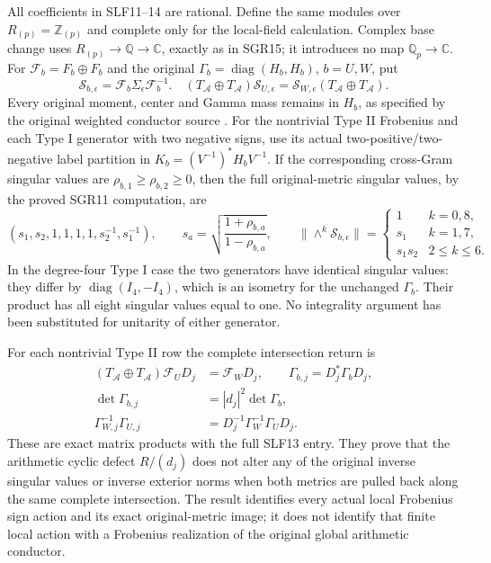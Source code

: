 \documentclass[11pt]{article}
\begin{document}
All coefficients in SLF11--14 are rational. Define the same modules
over $R_{(p)}=\mathbb Z_{(p)}$ and complete only for the local-field
calculation. Complex base change uses $R_{(p)}\to\mathbb Q\to\mathbb C$,
exactly as in SGR15; it introduces no map $\mathbb Q_p\to\mathbb C$.
For $\mathcal F_b=F_b\oplus F_b$ and the original
$\Gamma_b=\operatorname{diag}(H_b,H_b)$, $b=U,W$, put
\[
 \mathscr S_{b,\epsilon}=\mathcal F_b\Sigma_\epsilon\mathcal F_b^{-1}.
 \quad
 (T_{\mathcal A}\oplus T_{\mathcal A})\mathscr S_{U,\epsilon}
 =\mathscr S_{W,\epsilon}(T_{\mathcal A}\oplus T_{\mathcal A}).
                                                               \tag{SLF15}
\]
Every original moment, center and Gamma mass remains in $H_b$,
as specified by the original weighted conductor source \cite{WCF}.
For the nontrivial Type II Frobenius and each Type I generator with
two negative signs, use its actual two-positive/two-negative label
partition in $K_b=(V^{-1})^*H_bV^{-1}$.
If the corresponding cross-Gram singular values are
$\rho_{b,1}\ge\rho_{b,2}\ge0$, then the full original-metric
singular values, by the proved SGR11 computation, are
\[
 (s_1,s_2,1,1,1,1,s_2^{-1},s_1^{-1}),\qquad
 s_a=\sqrt{\frac{1+\rho_{b,a}}{1-\rho_{b,a}}},\qquad
 \|\wedge^k\mathscr S_{b,\epsilon}\|=
 \begin{cases}
 1&k=0,8,\\s_1&k=1,7,\\s_1s_2&2\le k\le6.
 \end{cases}                                                   \tag{SLF16}
\]
In the degree-four Type I case the two generators have identical
singular values: they differ by $\operatorname{diag}(I_4,-I_4)$,
which is an isometry for the unchanged $\Gamma_b$. Their product
has all eight singular values equal to one. No integrality argument
has been substituted for unitarity of either generator.

For each nontrivial Type II row the complete intersection return is
\[
\begin{aligned}
 (T_{\mathcal A}\oplus T_{\mathcal A})\mathcal F_UD_j
   &=\mathcal F_WD_j,\qquad \Gamma_{b,j}=D_j^*\Gamma_bD_j,\\
 \det\Gamma_{b,j}&=|d_j|^2\det\Gamma_b,\\
 \Gamma_{W,j}^{-1}\Gamma_{U,j}
   &=D_j^{-1}\Gamma_W^{-1}\Gamma_UD_j.
\end{aligned}                                                   \tag{SLF17}
\]
These are exact matrix products with the full SLF13 entry.
They prove that the arithmetic cyclic defect $R/(d_j)$ does not
alter any of the original inverse singular values or inverse
exterior norms when both metrics are pulled back along the same
complete intersection. The result identifies every actual local
Frobenius sign action and its exact original-metric image; it does
not identify that finite local action with a Frobenius realization
of the original global arithmetic conductor.
\end{document}

